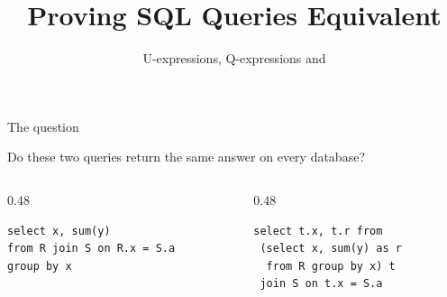 \documentclass[9pt,aspectratio=169]{beamer}
\title{Proving SQL Queries Equivalent}
\subtitle{U-expressions, Q-expressions and \liastar{}}
\date{}
\author{}
\begin{document}
\maketitle

\begin{frame}[fragile]{The question}
\begin{center}\large
Do these two queries return \alert{the same answer on every database}?
\end{center}
\vspace{2mm}
\begin{columns}[T]
\begin{column}{0.48\textwidth}
\begin{lstlisting}
select x, sum(y)
from R join S on R.x = S.a
group by x
\end{lstlisting}
\end{column}
\begin{column}{0.48\textwidth}
\begin{lstlisting}
select t.x, t.r from
 (select x, sum(y) as r
  from R group by x) t
 join S on t.x = S.a
\end{lstlisting}
\end{column}
\end{columns}
\vspace{4mm}
\end{frame}
\end{document}
